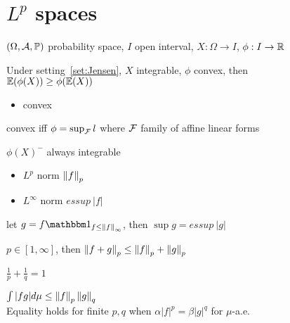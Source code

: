 \section{$L^p$ spaces}\label{sec:space}

\begin{setting}\label{set:Jensen}
    $(\Omega, \mathcal{A}, \mathbb{P})$ probability space, $I$ open interval, $X:\Omega \rightarrow I$, $\phi:I \rightarrow \mathbb{R}$
\end{setting}

\begin{prop}
    Under setting~\ref{set:Jensen}, $X$ integrable, $\phi$ convex, then \\
    $\mathbb{E} (\phi(X)) \geq \phi(\mathbb{E}(X))$
\end{prop}

\begin{itemize}
    \item convex
\end{itemize}

\begin{lemma}
    convex iff $\phi = \sup_{\mathcal{F}} l$ where $\mathcal{F}$ family of affine linear forms
\end{lemma}

\begin{fact}
    $\phi(X)^-$ always integrable
\end{fact}

\begin{itemize}
    \item $L^p$ norm $\left\lVert f\right\rVert_p$
    \item $L^\infty$ norm $essup\ |f|$
\end{itemize}

\begin{fact}
    let $g = f\In_{f \leq \norm{f}_\infty}$, then $\sup g = essup\ |g|$
\end{fact}

\begin{prop}
    $p \in [1, \infty]$, then $\left\lVert f + g\right\rVert_p \leq \left\lVert f\right\rVert_p + \left\lVert g\right\rVert_p$
\end{prop}

\begin{setting}
    $\frac{1}{p} + \frac{1}{q} = 1$
\end{setting}

\begin{prop}
    $\int |fg|d\mu \leq \left\lVert f\right\rVert_p\left\lVert g\right\rVert_q$ \\
    Equality holds for finite $p, q$ when $\alpha |f|^p = \beta |g|^q$ for $\mu$-a.e.\
\end{prop}

